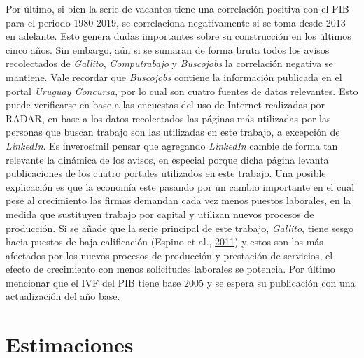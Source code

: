 \documentclass[12pt,oneside]{reedthesis}
\begin{document}
Por último, si bien la serie de vacantes tiene una correlación positiva con el PIB para el periodo 1980-2019, se correlaciona negativamente si se toma desde 2013 en adelante. Esto genera dudas importantes sobre su construcción en los últimos cinco años. Sin embargo, aún si se sumaran de forma bruta todos los avisos recolectados de \emph{Gallito}, \emph{Computrabajo} y \emph{Buscojobs} la correlación negativa se mantiene. Vale recordar que \emph{Buscojobs} contiene la información publicada en el portal \emph{Uruguay Concursa}, por lo cual son cuatro fuentes de datos relevantes. Esto puede verificarse en base a las encuestas del uso de Internet realizadas por RADAR, en base a los datos recolectados las páginas más utilizadas por las personas que buscan trabajo son las utilizadas en este trabajo, a excepción de \emph{LinkedIn}. Es inverosímil pensar que agregando \emph{LinkedIn} cambie de forma tan relevante la dinámica de los avisos, en especial porque dicha página levanta publicaciones de los cuatro portales utilizados en este trabajo. Una posible explicación es que la economía este pasando por un cambio importante en el cual pese al crecimiento las firmas demandan cada vez menos puestos laborales, en la medida que sustituyen trabajo por capital y utilizan nuevos procesos de producción. Si se añade que la serie principal de este trabajo, \emph{Gallito}, tiene sesgo hacia puestos de baja calificación (Espino et al., \protect\hyperlink{ref-Alma2011}{2011}) y estos son los más afectados por los nuevos procesos de producción y prestación de servicios, el efecto de crecimiento con menos solicitudes laborales se potencia. Por último mencionar que el IVF del PIB tiene base 2005 y se espera su publicación con una actualización del año base.

\hypertarget{estimaciones}{%
\section{Estimaciones}\label{estimaciones}}
\end{document}
